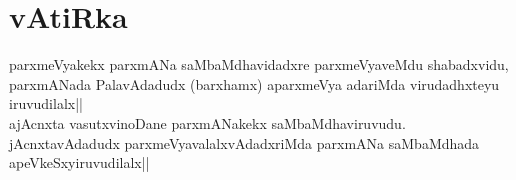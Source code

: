 \section*{vAtiRka}


\begin{artha} 
parxmeVyakekx parxmANa saMbaMdhavidadxre parxmeVyaveMdu shabadxvidu, 
parxmANada PalavAdadudx (barxhamx) aparxmeVya adariMda virudadhxteyu 
iruvudilalx||\\
ajAcnxta vasutxvinoDane parxmANakekx saMbaMdhaviruvudu. 
jAcnxtavAdadudx parxmeVyavalalxvAdadxriMda parxmANa saMbaMdhada 
apeVkeSxyiruvudilalx||
\end{artha}


